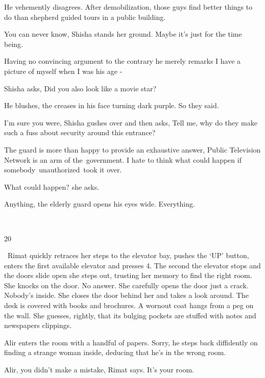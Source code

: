 \documentclass[12pt]{book}
\begin{document}
He vehemently disagrees. {\textquotedbl}After demobilization, those guys find better things to do than shepherd guided
tours in a public building.{\textquotedbl}

{\textquotedbl}You can never know,{\textquotedbl} Shisha stands her ground. {\textquotedbl}Maybe it's just for the time
being.{\textquotedbl}

Having no convincing argument to the contrary he merely remarks {\textquotedbl}I have a picture of myself when I was his
age -{\textquotedbl} \

Shisha asks, {\textquotedbl}Did you also look like a movie star?{\textquotedbl}

He blushes, the creases in his face turning dark purple. {\textquotedbl}So they said.{\textquotedbl}~

{\textquotedbl}I'm sure you were,{\textquotedbl} Shisha gushes over and then asks, {\textquotedbl}Tell me, why do they
make such a fuss about security around this entrance?{\textquotedbl}

The guard is more than happy to provide an exhaustive answer, {\textquotedbl}Public Television Network is an arm of
the~government. I hate to think what could happen if somebody~unauthorized~took it over.{\textquotedbl}

{\textquotedbl}What could happen?{\textquotedbl} she asks.

{\textquotedbl}Anything,{\textquotedbl} the elderly guard opens his eyes wide. {\textquotedbl}Everything.{\textquotedbl}

~

20~

~Rimat quickly retraces her steps to the elevator bay, pushes the `UP' button, enters the first available elevator and
presses 4. The second the elevator stops and the doors slide open she steps out, trusting her memory to find the right
room. She knocks on the door. No answer. She carefully opens the door just a crack. Nobody's inside. She closes the
door behind her and takes a look around. The desk is covered with books and brochures. A wornout coat hangs from a peg
on the wall. She guesses, rightly, that its bulging pockets are stuffed with notes and{ }newspapers
clippings.

Alir enters the room with a handful of papers. {\textquotedbl}Sorry,{\textquotedbl} he steps back diffidently on finding
a strange woman inside, deducing that he's in the wrong room.

{\textquotedbl}Alir, you didn't make a mistake,{\textquotedbl} Rimat says. {\textquotedbl}It's your room.{\textquotedbl}
\end{document}
